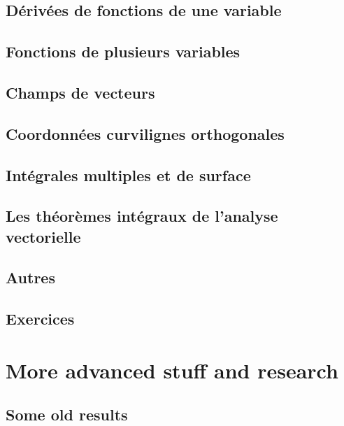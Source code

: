 \chapter{Dérivées de fonctions de une variable}


\chapter{Fonctions de plusieurs variables}


\chapter{Champs de vecteurs}


\chapter{Coordonnées curvilignes orthogonales}


\chapter{Intégrales multiples et de surface}


\chapter{Les théorèmes intégraux de l'analyse vectorielle}


\chapter{Autres}


\chapter{Exercices}


\part{More advanced stuff and research}



\chapter{Some old results}


